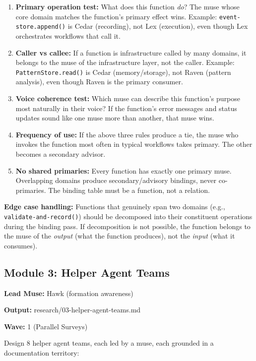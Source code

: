 \documentclass[11pt,letterpaper]{article}
\newcommand{\metafield}[2]{\textbf{\sffamily #1} #2\par}
\begin{document}
\begin{enumerate}
\item \textbf{Primary operation test:} What does this function \emph{do}? The muse whose core domain matches the function's primary effect wins. Example: \texttt{event-store.append()} is Cedar (recording), not Lex (execution), even though Lex orchestrates workflows that call it.

\item \textbf{Caller vs callee:} If a function is infrastructure called by many domains, it belongs to the muse of the infrastructure layer, not the caller. Example: \texttt{PatternStore.read()} is Cedar (memory/storage), not Raven (pattern analysis), even though Raven is the primary consumer.

\item \textbf{Voice coherence test:} Which muse can describe this function's purpose most naturally in their voice? If the function's error messages and status updates sound like one muse more than another, that muse wins.

\item \textbf{Frequency of use:} If the above three rules produce a tie, the muse who invokes the function most often in typical workflows takes primary. The other becomes a secondary advisor.

\item \textbf{No shared primaries:} Every function has exactly one primary muse. Overlapping domains produce secondary/advisory bindings, never co-primaries. The binding table must be a function, not a relation.
\end{enumerate}

\textbf{Edge case handling:} Functions that genuinely span two domains (e.g., \texttt{validate-and-record()}) should be decomposed into their constituent operations during the binding pass. If decomposition is not possible, the function belongs to the muse of the \emph{output} (what the function produces), not the \emph{input} (what it consumes).

\subsection{Module 3: Helper Agent Teams}

\metafield{Lead Muse:}{Hawk (formation awareness)}
\metafield{Output:}{research/03-helper-agent-teams.md}
\metafield{Wave:}{1 (Parallel Surveys)}

Design 8 helper agent teams, each led by a muse, each grounded in a documentation territory:
\end{document}

